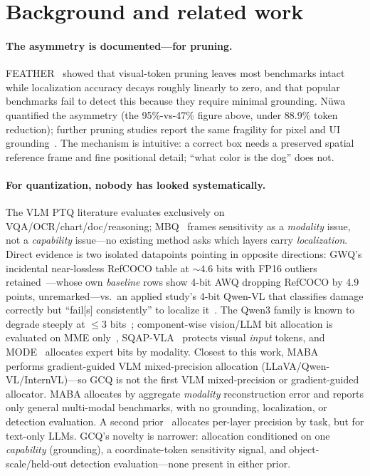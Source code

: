 \documentclass{article}
\begin{document}
\section{Background and related work}

\paragraph{The asymmetry is documented---for pruning.} FEATHER~\cite{feather} showed that visual-token pruning leaves most benchmarks intact while localization accuracy decays roughly linearly to zero, and that popular benchmarks fail to detect this because they require minimal grounding. N\"uwa~\cite{nuwa} quantified the asymmetry (the 95\%-vs-47\% figure above, under 88.9\% token reduction); further pruning studies report the same fragility for pixel and UI grounding~\cite{litelvlm,focusui}. The mechanism is intuitive: a correct box needs a preserved spatial reference frame and fine positional detail; ``what color is the dog'' does not.

\paragraph{For quantization, nobody has looked systematically.} The VLM PTQ literature evaluates exclusively on VQA/OCR/chart/doc/reasoning; MBQ~\cite{mbq} frames sensitivity as a \emph{modality} issue, not a \emph{capability} issue---no existing method asks which layers carry \emph{localization}. Direct evidence is two isolated datapoints pointing in opposite directions: GWQ's incidental near-lossless RefCOCO table at ${\sim}4.6$ bits with FP16 outliers retained~\cite{gwq}---whose own \emph{baseline} rows show 4-bit AWQ dropping RefCOCO by 4.9 points, unremarked---vs.\ an applied study's 4-bit Qwen-VL that classifies damage correctly but ``fail[s] consistently'' to localize it~\cite{vehicledamage}. The Qwen3 family is known to degrade steeply at $\le$3 bits~\cite{qwen3quant}; component-wise vision/LLM bit allocation is evaluated on MME only~\cite{rethinkingsmall}, SQAP-VLA~\cite{sqapvla} protects visual \emph{input} tokens, and MODE~\cite{mode} allocates expert bits by modality. Closest to this work, MABA~\cite{maba} performs gradient-guided VLM mixed-precision allocation (LLaVA/Qwen-VL/InternVL)---so GCQ is not the first VLM mixed-precision or gradient-guided allocator. MABA allocates by aggregate \emph{modality} reconstruction error and reports only general multi-modal benchmarks, with no grounding, localization, or detection evaluation. A second prior~\cite{taq} allocates per-layer precision by task, but for text-only LLMs. GCQ's novelty is narrower: allocation conditioned on one \emph{capability} (grounding), a coordinate-token sensitivity signal, and object-scale/held-out detection evaluation---none present in either prior.
\end{document}
